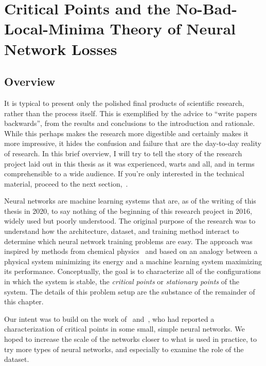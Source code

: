 \documentclass[../../thesis.tex]{subfiles}
\begin{document}
\chapter{Critical Points and the No-Bad-Local-Minima Theory of Neural Network Losses}
\onlyinsubfile{\begin{KeepFromToc}
		\tableofcontents
		\clearpage
		\listoffigures
		\listoftables
	\end{KeepFromToc}}
\onlyinsubfile{\clearpage}
\onlyinsubfile{\linenumbers}

\section{Overview}

It is typical to present only the polished final
products of scientific research,
rather than the process itself.
This is exemplified by the advice to
\enquote{write papers backwards},
from the results and conclusions to the introduction and rationale.
While this perhaps makes the research more digestible and
certainly makes it more impressive,
it hides the confusion and failure
that are the day-to-day reality of research.
In this brief overview,
I will try to tell the story of the research project
laid out in this thesis as it was experienced,
warts and all,
and in terms comprehensible to a wide audience.
If you're only interested in the technical material,
proceed to the next section,~.

Neural networks are machine learning systems
that are, as of the writing of this thesis in 2020,
to say nothing of the beginning of this research project in 2016,
widely used but poorly understood.
The original purpose of the research was to
understand how the
architecture, dataset, and training method
interact to determine which neural network training problems
are easy.
The approach was inspired by methods from chemical physics~\cite{ballard2017}
and based on an analogy between a physical system minimizing its energy
and a machine learning system maximizing its performance.
Conceptually, the goal is to characterize all of the configurations
in which the system is stable,
the \emph{critical points} or \emph{stationary points}
of the system.
The details of this problem setup are the substance
of the remainder of this chapter.

Our intent was to build on the work
of~\cite{dauphin2014} and~\cite{pennington2017},
who had reported a characterization of critical points in
some small, simple neural networks.
We hoped to increase the scale of the networks
closer to what is used in practice,
to try more types of neural networks,
and especially to examine the role of the dataset.
\end{document}
